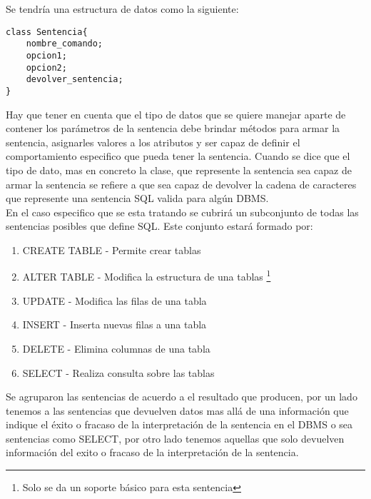 Se tendría una estructura de datos como la siguiente:

\begin{lstlisting}[title=Pseudocódigo de la estructura de dato que contiene la sentencia]
class Sentencia{
	nombre_comando;
	opcion1;
	opcion2;
	devolver_sentencia;
}
\end{lstlisting}

Hay que tener en cuenta que el tipo de datos que se quiere manejar aparte de contener los parámetros de la sentencia debe brindar métodos para armar la sentencia, asignarles valores a los atributos y ser capaz de definir el comportamiento especifico que pueda tener la sentencia. Cuando se dice que el tipo de dato, mas en concreto la clase, que represente la sentencia sea capaz de armar la sentencia se refiere a que sea capaz de devolver la cadena de caracteres que represente una sentencia SQL valida para algún DBMS.\\
En el caso especifico que se esta tratando se cubrirá un subconjunto de todas las sentencias posibles que define SQL. Este conjunto estará formado por:
\begin{enumerate}
\item CREATE TABLE - Permite crear tablas 
\item ALTER TABLE - Modifica la estructura de una tablas \footnote{Solo se da un soporte básico para esta sentencia}
\item UPDATE - Modifica las filas de una tabla 
\item INSERT - Inserta nuevas filas a una tabla
\item DELETE - Elimina columnas de una tabla
\item SELECT - Realiza consulta sobre las tablas
\end{enumerate}

Se agruparon las sentencias de acuerdo a el resultado que producen, por un lado tenemos a las sentencias que devuelven datos mas allá de una información que indique el éxito o fracaso de la interpretación de la sentencia en el DBMS o sea sentencias como SELECT, por otro lado tenemos aquellas que solo devuelven información del exito o fracaso de la interpretación de la sentencia.





